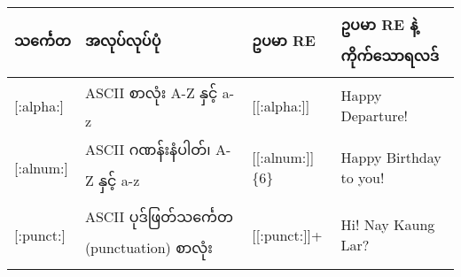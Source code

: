 \documentclass[11pt]{article}
\begin{document}
\begin{longtable}[c]{@{}llll@{}}
\toprule
\begin{minipage}[b]{0.12\columnwidth}\raggedright\strut
သင်္ကေတ
\strut\end{minipage} &
\begin{minipage}[b]{0.15\columnwidth}\raggedright\strut
အလုပ်လုပ်ပုံ
\strut\end{minipage} &
\begin{minipage}[b]{0.12\columnwidth}\raggedright\strut
ဥပမာ RE
\strut\end{minipage} &
\begin{minipage}[b]{0.10\columnwidth}\raggedright\strut
ဥပမာ RE နဲ့ ကိုက်သောရလဒ်
\strut\end{minipage}\tabularnewline
\midrule
\endhead
\begin{minipage}[t]{0.12\columnwidth}\raggedright\strut
{[}:alpha:{]}
\strut\end{minipage} &
\begin{minipage}[t]{0.15\columnwidth}\raggedright\strut
ASCII စာလုံး A-Z နှင့် a-z
\strut\end{minipage} &
\begin{minipage}[t]{0.12\columnwidth}\raggedright\strut
{[}{[}:alpha:{]}{]}
\strut\end{minipage} &
\begin{minipage}[t]{0.10\columnwidth}\raggedright\strut
{Happy Departure}!
\strut\end{minipage}\tabularnewline
\begin{minipage}[t]{0.12\columnwidth}\raggedright\strut
{[}:alnum:{]}
\strut\end{minipage} &
\begin{minipage}[t]{0.15\columnwidth}\raggedright\strut
ASCII ဂဏန်းနံပါတ်၊ A-Z နှင့် a-z
\strut\end{minipage} &
\begin{minipage}[t]{0.12\columnwidth}\raggedright\strut
{[}{[}:alnum:{]}{]}\{6\}
\strut\end{minipage} &
\begin{minipage}[t]{0.10\columnwidth}\raggedright\strut
Happy {Birthd}ay to you!
\strut\end{minipage}\tabularnewline
\begin{minipage}[t]{0.12\columnwidth}\raggedright\strut
{[}:punct:{]}
\strut\end{minipage} &
\begin{minipage}[t]{0.15\columnwidth}\raggedright\strut
ASCII ပုဒ်ဖြတ်သင်္ကေတ (punctuation) စာလုံး
\strut\end{minipage} &
\begin{minipage}[t]{0.12\columnwidth}\raggedright\strut
{[}{[}:punct:{]}{]}+
\strut\end{minipage} &
\begin{minipage}[t]{0.10\columnwidth}\raggedright\strut
Hi{!} Nay Kaung Lar{?}
\strut\end{minipage}\tabularnewline
\bottomrule
\end{longtable}
\end{document}
